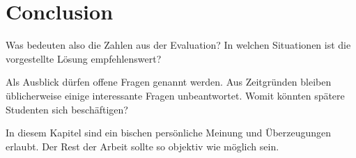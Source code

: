 \chapter{Conclusion}\label{sec:conclusion}

Was bedeuten also die Zahlen aus der Evaluation?
In welchen Situationen ist die vorgestellte Lösung empfehlenswert?

Als Ausblick dürfen offene Fragen genannt werden.
Aus Zeitgründen bleiben üblicherweise einige interessante Fragen unbeantwortet.
Womit könnten spätere Studenten sich beschäftigen?

In diesem Kapitel sind ein bischen persönliche Meinung
und Überzeugungen erlaubt.
Der Rest der Arbeit sollte so objektiv wie möglich sein.
